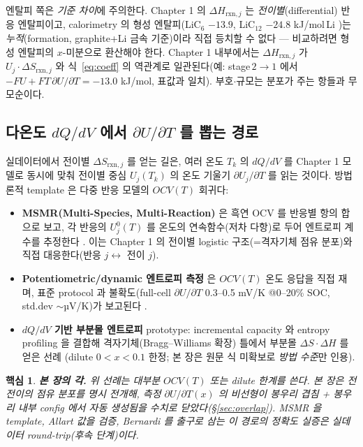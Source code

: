 \documentclass[11pt,a4paper]{article}
\newtheorem*{keybox}{핵심}
\newcommand{\rxn}{\mathrm{rxn}}
\begin{document}
엔탈피 쪽은 \emph{기준 차이}에 주의한다. Chapter 1 의 $\Delta H_{\rxn,j}$ 는 \emph{전이별}(differential)
반응 엔탈피이고, calorimetry 의 형성 엔탈피(LiC$_6$ $-13.9$, LiC$_{12}$ $-24.8$ kJ/mol\,Li
\cite{chemmater2015})는 \emph{누적}(formation, graphite+Li 금속 기준)이라 직접 등치할 수 없다 — 비교하려면
형성 엔탈피의 $x$-미분으로 환산해야 한다. Chapter 1 내부에서는 $\Delta H_{\rxn,j}$ 가
$U_j\cdot\Delta S_{\rxn,j}$ 와 식~\eqref{eq:coeff} 의 역관계로 일관된다(예: stage\,$2\!\to\!1$ 에서
$-FU+FT\,\partial U/\partial T=-13.0$ kJ/mol, 표값과 일치). 부호$\cdot$규모는 분포가 주는 항들과 무모순이다.

\subsection{다온도 $dQ/dV$ 에서 $\partial U/\partial T$ 를 뽑는 경로}\label{sub:estimate}
실데이터에서 전이별 $\Delta S_{\rxn,j}$ 를 얻는 길은, 여러 온도 $T_k$ 의 $dQ/dV$ 를 Chapter 1 모델로
동시에 맞춰 전이별 중심 $U_j(T_k)$ 의 온도 기울기 $\partial U_j/\partial T$ 를 읽는 것이다. 방법론적
template 은 다중 반응 모델의 $OCV(T)$ 회귀다:
\begin{itemize}[leftmargin=1.4em,itemsep=2pt]
\item \textbf{MSMR(Multi-Species, Multi-Reaction)} 은 흑연 OCV 를 반응별 항의 합으로 보고, 각 반응의
$U_j^0(T)$ 를 온도의 연속함수(저차 다항)로 두어 엔트로피 계수를 추정한다 \cite{msmr_partI,msmr_partII}.
이는 Chapter 1 의 전이별 logistic 구조(=격자기체 점유 분포)와 직접 대응한다(반응 $j\leftrightarrow$
전이 $j$).
\item \textbf{Potentiometric/dynamic 엔트로피 측정} 은 $OCV(T)$ 온도 응답을 직접 재며, 표준 protocol 과
불확도(full-cell $\partial U/\partial T$ 0.3--0.5 mV/K @0--20\% SOC, std.dev $\sim$µV/K)가 보고된다
\cite{standardised2024}.
\item \textbf{$dQ/dV$ 기반 부분몰 엔트로피} prototype: incremental capacity 와 entropy profiling 을 결합해
격자기체(Bragg--Williams 확장) 틀에서 부분몰 $\Delta S\cdot\Delta H$ 를 얻은 선례 \cite{occupation2019}
(dilute $0<x<0.1$ 한정; 본 장은 원문 식 미확보로 \emph{방법 수준}만 인용).
\end{itemize}

\begin{keybox}
\textbf{본 장의 각.} 위 선례는 대부분 $OCV(T)$ 또는 dilute 한계를 쓴다. 본 장은 \emph{전} 전이의
점유 \emph{분포}를 명시 전개해, 측정 $\partial U/\partial T(x)$ 의 비선형이 봉우리 겹침 + 봉우리 내부
config 에서 \emph{자동 생성}됨을 수치로 닫았다(\S\ref{sec:overlap}). MSMR 을 template, Allart 값을
검증, Bernardi 를 출구로 삼는 이 경로의 정확도 실증은 실데이터 round-trip(후속 단계)이다.
\end{keybox}
\end{document}

